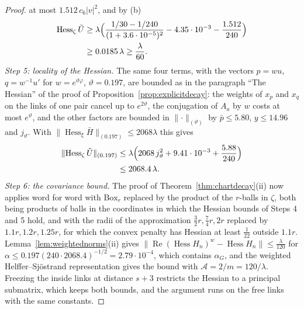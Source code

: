 \documentclass[11pt]{amsart}
\theoremstyle{definition}
\theoremstyle{remark}
\numberwithin{equation}{section}
\begin{document}
\begin{proof}
at most $1.512\,c_6\lvert v\rvert^2$, and by (b)
\[
\begin{split}
\operatorname{Hess}_\zeta\tilde U&\ge\lambda\Bigl(\frac{1/30-1/240}
{(1+3.6\cdot10^{-5})^2}-4.35\cdot10^{-3}-\frac{1.512}{240}\Bigr)\\
&\ge0.0185\,\lambda\ge\frac\lambda{60}.
\end{split}
\]
\emph{Step 5: locality of the Hessian.} The same four terms, with the
vectors $p=wu$, $q=w^{-1}u'$ for $w=e^{\vartheta\varphi}$,
$\vartheta=0.197$, are bounded as in the paragraph ``The Hessian'' of the
proof of Proposition~\ref{prop:explicitdecay}: the weights of $x_p$ and
$x_q$ on the links of one pair cancel up to $e^{2\vartheta}$, the
conjugation of $A_a$ by $w$ costs at most $e^\vartheta$, and the other
factors are bounded in $\lVert\cdot\rVert_{(\vartheta)}$ by
$\bar p\le5.80$, $y\le14.96$ and $j_\vartheta$. With
$\lVert\operatorname{Hess}_\xi\bar H\rVert_{(0.197)}\le2068\lambda$ this
gives
\[
\begin{split}
\lVert\operatorname{Hess}_\zeta\tilde U\rVert_{(0.197)}&\le\lambda\Bigl(
2068\,j_\vartheta^2+9.41\cdot10^{-3}+\frac{5.88}{240}\Bigr)\\
&\le2068.4\,\lambda .
\end{split}
\]
\emph{Step 6: the covariance bound.} The proof of
Theorem~\ref{thm:chartdecay}(ii) now applies word for word with
$\mathrm{Box}_r$ replaced by the product of the $r$-balls in $\zeta$, both
being products of balls in the coordinates in which the Hessian bounds of
Steps 4 and 5 hold, and with the radii of the approximation
$\frac32r,\frac74r,2r$ replaced by $1.1r,1.2r,1.25r$, for which the
convex penalty has Hessian at least $\frac1{22}$ outside $1.1r$.
Lemma~\ref{lem:weightednorms}(ii) gives
$\lVert\operatorname{Re}(\operatorname{Hess}H_n)^w-\operatorname{Hess}
H_n\rVert\le\frac\lambda{120}$ for $\alpha\le0.197(240\cdot2068.4)^{-1/2}
=2.79\cdot10^{-4}$, which contains $\alpha_G$, and the weighted
Helffer--Sjöstrand representation gives the bound with $\mathcal A=2/m=
120/\lambda$. Freezing the inside links at distance $s+3$ restricts the
Hessian to a principal submatrix, which keeps both bounds, and the
argument runs on the free links with the same constants.
\end{proof}
\end{document}
